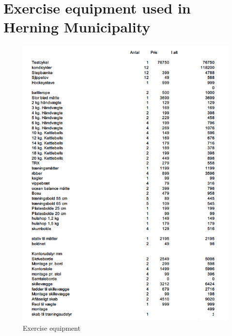 \chapter{Exercise equipment used in Herning Municipality}
\begin{figure}[H]
\centering
\includegraphics[width=1.0\textwidth]{Figure/8}
\caption{Exercise equipment}

\end{figure} 

 
